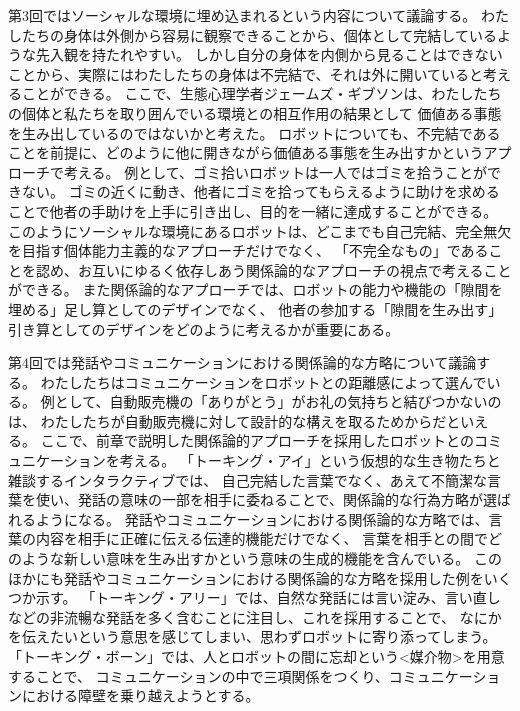 \documentclass[]{jarticle}          %
\begin{document}
第3回ではソーシャルな環境に埋め込まれるという内容について議論する。
わたしたちの身体は外側から容易に観察できることから、個体として完結しているような先入観を持たれやすい。
しかし自分の身体を内側から見ることはできないことから、実際にはわたしたちの身体は不完結で、それは外に開いていると考えることができる。
ここで、生態心理学者ジェームズ・ギブソンは、わたしたちの個体と私たちを取り囲んでいる環境との相互作用の結果として
価値ある事態を生み出しているのではないかと考えた。
ロボットについても、不完結であることを前提に、どのように他に開きながら価値ある事態を生み出すかというアプローチで考える。
例として、ゴミ拾いロボットは一人ではゴミを拾うことができない。
ゴミの近くに動き、他者にゴミを拾ってもらえるように助けを求めることで他者の手助けを上手に引き出し、目的を一緒に達成することができる。
このようにソーシャルな環境にあるロボットは、どこまでも自己完結、完全無欠を目指す個体能力主義的なアプローチだけでなく、
「不完全なもの」であることを認め、お互いにゆるく依存しあう関係論的なアプローチの視点で考えることができる。
また関係論的なアプローチでは、ロボットの能力や機能の「隙間を埋める」足し算としてのデザインでなく、
他者の参加する「隙間を生み出す」引き算としてのデザインをどのように考えるかが重要にある。

第4回では発話やコミュニケーションにおける関係論的な方略について議論する。
わたしたちはコミュニケーションをロボットとの距離感によって選んでいる。
例として、自動販売機の「ありがとう」がお礼の気持ちと結びつかないのは、
わたしたちが自動販売機に対して設計的な構えを取るためからだといえる。
ここで、前章で説明した関係論的アプローチを採用したロボットとのコミュニケーションを考える。
「トーキング・アイ」という仮想的な生き物たちと雑談するインタラクティブでは、
自己完結した言葉でなく、あえて不簡潔な言葉を使い、発話の意味の一部を相手に委ねることで、関係論的な行為方略が選ばれるようになる。
発話やコミュニケーションにおける関係論的な方略では、言葉の内容を相手に正確に伝える伝達的機能だけでなく、
言葉を相手との間でどのような新しい意味を生み出すかという意味の生成的機能を含んでいる。
このほかにも発話やコミュニケーションにおける関係論的な方略を採用した例をいくつか示す。
「トーキング・アリー」では、自然な発話には言い淀み、言い直しなどの非流暢な発話を多く含むことに注目し、これを採用することで、
なにかを伝えたいという意思を感じてしまい、思わずロボットに寄り添ってしまう。
「トーキング・ボーン」では、人とロボットの間に忘却という<媒介物>を用意することで、
コミュニケーションの中で三項関係をつくり、コミュニケーションにおける障壁を乗り越えようとする。
\end{document}
